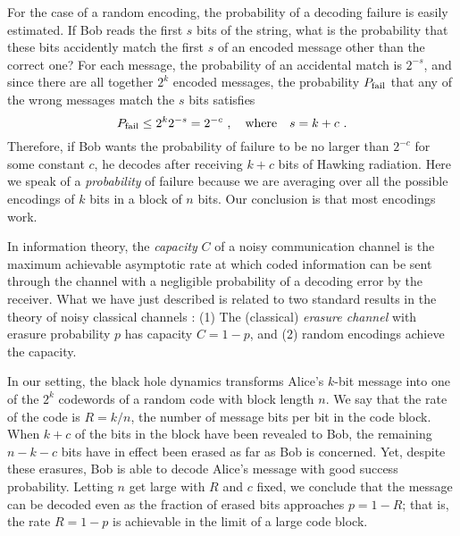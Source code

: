 \documentclass[12pt]{article}
\begin{document}
For the case of a random encoding, the probability of a decoding failure is easily estimated. If Bob reads the first $s$ bits of the string, what is the probability that these bits accidently match the first $s$ of an encoded message other than the correct one? For each message, the probability of an accidental match is $2^{-s}$, and since there are all together $2^k$ encoded messages, the probability $P_{\rm fail}$ that any of the wrong messages match the $s$ bits satisfies
\begin{equation}
\label{classical-out}
P_{\rm fail} \le 2^k 2^{-s}= 2^{-c}~,\quad {\rm where} \quad s=k+c~.
\end{equation}
Therefore, if Bob wants the probability of failure to be no larger than $2^{-c}$ for some constant $c$, he decodes after receiving $k+c$ bits of Hawking radiation. Here we speak of a {\em probability} of failure because we are averaging over all the possible encodings of $k$ bits in a block of $n$ bits. Our conclusion is that most encodings work. 

In information theory, the {\em capacity} $C$ of a noisy communication channel is the maximum achievable asymptotic rate at which coded information can be sent through the channel with a negligible probability of a decoding error by the receiver. What we have just described is related to two standard results in the theory of noisy classical channels \cite{cover}: (1) The (classical) {\em erasure channel} with erasure probability $p$ has capacity $C=1-p$, and (2) random encodings achieve the capacity.

In our setting, the black hole dynamics transforms Alice's $k$-bit message into one of the $2^k$ codewords of a random code with block length $n$. We say that the rate of the code is $R=k/n$, the number of message bits per bit in the code block. When $k+c$ of the bits in the block have been revealed to Bob, the remaining $n-k-c$ bits have in effect been erased as far as Bob is concerned. Yet, despite these erasures, Bob is able to decode Alice's message with good success probability. Letting $n$ get large with $R$ and $c$ fixed, we conclude that the message can be decoded even as the fraction of erased bits approaches $p=1-R$; that is, the rate $R=1-p$ is achievable in the limit of a large code block.
\end{document}
